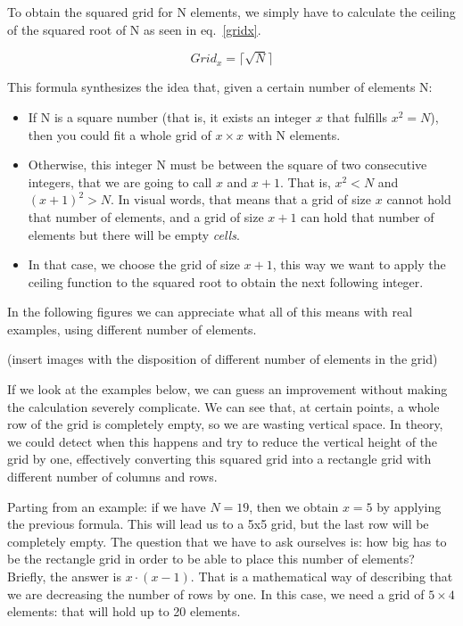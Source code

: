 To obtain the squared grid for N elements, we simply have to calculate the ceiling of the squared root of N as seen in eq.~\eqref{gridx}.

\begin{equation}
  Grid_{x} = \lceil\sqrt{N}\rceil \label{gridx}
\end{equation}

This formula synthesizes the idea that, given a certain number of elements N:

\begin{itemize}

  \item If N is a square number (that is, it exists an integer $x$ that fulfills $x^2 = N$), then you could fit a whole grid of $x\times{}x$ with N elements.

  \item Otherwise, this integer N must be between the square of two consecutive integers, that we are going to call $x$ and $x+1$.
  That is, $x^2 < N$ and $(x+1)^2 > N$.
  In visual words, that means that a grid of size $x$ cannot hold that number of elements, and a grid of size $x+1$ can hold that number of elements but there will be empty \emph{cells}.

  \item In that case, we choose the grid of size $x+1$, this way we want to apply the ceiling function to the squared root to obtain the next following integer.

\end{itemize}

In the following figures we can appreciate what all of this means with real examples, using different number of elements.

(insert images with the disposition of different number of elements in the grid)

If we look at the examples below, we can guess an improvement without making the calculation severely complicate.
We can see that, at certain points, a whole row of the grid is completely empty, so we are wasting vertical space.
In theory, we could detect when this happens and try to reduce the vertical height of the grid by one, effectively converting this squared grid into a rectangle grid with different number of columns and rows.

Parting from an example: if we have $N = 19$, then we obtain $x = 5$ by applying the previous formula.
This will lead us to a 5x5 grid, but the last row will be completely empty. The question that we have to ask ourselves is:
how big has to be the rectangle grid in order to be able to place this number of elements?
Briefly, the answer is $x \cdot (x - 1)$.
That is a mathematical way of describing that we are decreasing the number of rows by one.
In this case, we need a grid of $5 \times 4$ elements: that will hold up to 20 elements.

